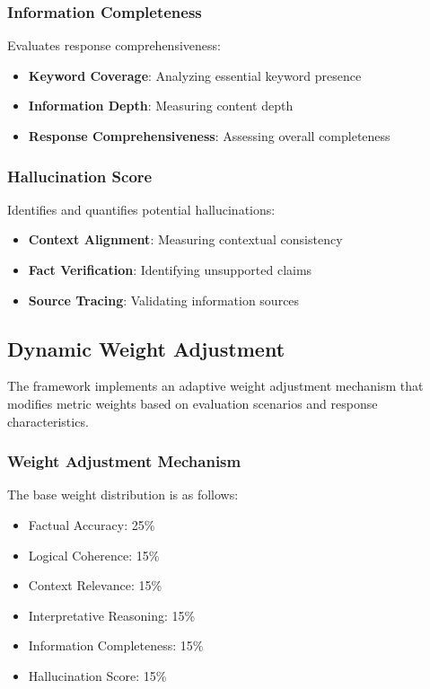 \subsubsection{Information Completeness}
Evaluates response comprehensiveness:
\begin{itemize}
    \item \textbf{Keyword Coverage}: Analyzing essential keyword presence
    \item \textbf{Information Depth}: Measuring content depth
    \item \textbf{Response Comprehensiveness}: Assessing overall completeness
\end{itemize}

\subsubsection{Hallucination Score}
Identifies and quantifies potential hallucinations:
\begin{itemize}
    \item \textbf{Context Alignment}: Measuring contextual consistency
    \item \textbf{Fact Verification}: Identifying unsupported claims
    \item \textbf{Source Tracing}: Validating information sources
\end{itemize}

\subsection{Dynamic Weight Adjustment}
The framework implements an adaptive weight adjustment mechanism that modifies metric weights based on evaluation scenarios and response characteristics.

\subsubsection{Weight Adjustment Mechanism}
The base weight distribution is as follows:
\begin{itemize}
    \item Factual Accuracy: 25\%
    \item Logical Coherence: 15\%
    \item Context Relevance: 15\%
    \item Interpretative Reasoning: 15\%
    \item Information Completeness: 15\%
    \item Hallucination Score: 15\%
\end{itemize}

